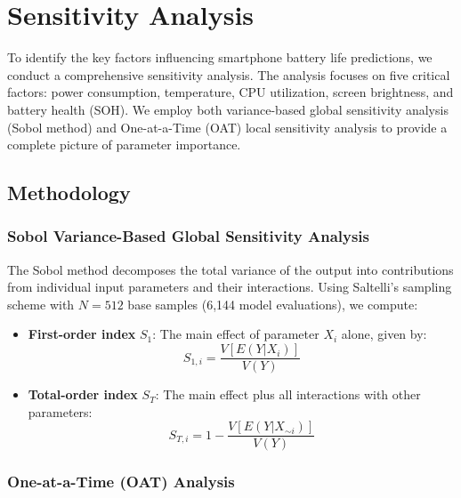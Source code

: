 \section{Sensitivity Analysis}
\label{sec:sensitivity}

\hspace*{\parindent}To identify the key factors influencing smartphone battery life predictions, we conduct a comprehensive sensitivity analysis. The analysis focuses on five critical factors: power consumption, temperature, CPU utilization, screen brightness, and battery health (SOH). We employ both variance-based global sensitivity analysis (Sobol method) \cite{Sobol2001, Saltelli2008} and One-at-a-Time (OAT) local sensitivity analysis to provide a complete picture of parameter importance.

\subsection{Methodology}

\subsubsection{Sobol Variance-Based Global Sensitivity Analysis}

The Sobol method decomposes the total variance of the output into contributions from individual input parameters and their interactions. Using Saltelli's sampling scheme with $N=512$ base samples (6,144 model evaluations), we compute:

\begin{itemize}[noitemsep]
    \item \textbf{First-order index} $S_1$: The main effect of parameter $X_i$ alone, given by:
    \begin{equation}
        S_{1,i} = \frac{V[E(Y|X_i)]}{V(Y)}
    \end{equation}
    
    \item \textbf{Total-order index} $S_T$: The main effect plus all interactions with other parameters:
    \begin{equation}
        S_{T,i} = 1 - \frac{V[E(Y|X_{\sim i})]}{V(Y)}
    \end{equation}
\end{itemize}

\subsubsection{One-at-a-Time (OAT) Analysis}

